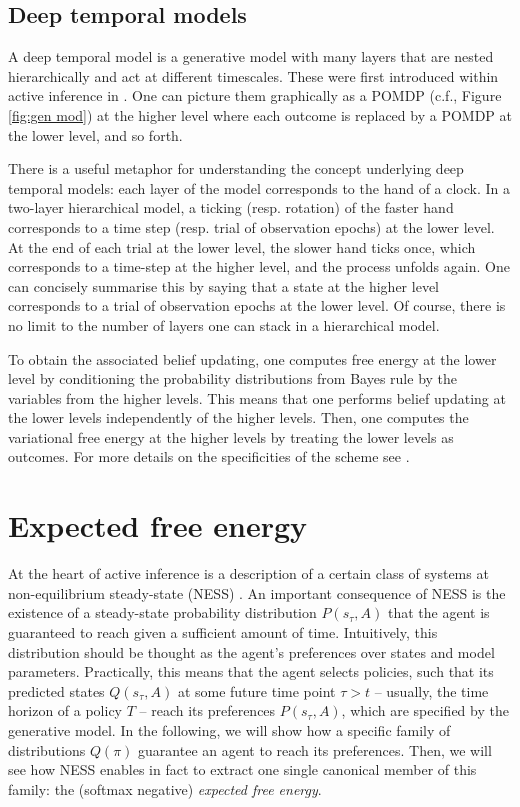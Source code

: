 \documentclass[review,12pt,authoryear]{elsarticle}
\begin{document}
\subsection{Deep temporal models}
\label{appendix: deep temporal models}

A deep temporal model is a generative model with many layers that are nested hierarchically and act at different timescales. These were first introduced within active inference in \citep{fristonActiveInferenceCuriosity2017}. One can picture them graphically as a POMDP (c.f., Figure \ref{fig:gen mod}) at the higher level where each outcome is replaced by a POMDP at the lower level, and so forth.

There is a useful metaphor for understanding the concept underlying deep temporal models: each layer of the model corresponds to the hand of a clock. In a two-layer hierarchical model, a ticking (resp. rotation) of the faster hand corresponds to a time step (resp. trial of observation epochs) at the lower level. At the end of each trial at the lower level, the slower hand ticks once, which corresponds to a time-step at the higher level, and the process unfolds again. One can concisely summarise this by saying that a state at the higher level corresponds to a trial of observation epochs at the lower level. Of course, there is no limit to the number of layers one can stack in a hierarchical model.

To obtain the associated belief updating, one computes free energy at the lower level by conditioning the probability distributions from Bayes rule by the variables from the higher levels. This means that one performs belief updating at the lower levels independently of the higher levels. Then, one computes the variational free energy at the higher levels by treating the lower levels as outcomes. For more details on the specificities of the scheme see \citep{fristonActiveInferenceCuriosity2017}.


\section{Expected free energy}
\label{Appendix:steady-state lemma}

At the heart of active inference is a description of a certain class of systems at non-equilibrium steady-state (NESS) \citep{parrMarkovBlanketsInformation2019,fristonFreeEnergyPrinciple2019}. An important consequence of NESS is the existence of a steady-state probability distribution $P(s_\tau,A)$ that the agent is guaranteed to reach given a sufficient amount of time. Intuitively, this distribution should be thought as the agent's preferences over states and model parameters. Practically, this means that the agent selects policies, such that its predicted states $Q(s_\tau,A)$ at some future time point $\tau >t$ -- usually, the time horizon of a policy $T$ -- reach its preferences $P(s_\tau,A)$, which are specified by the generative model. In the following, we will show how a specific family of distributions $Q(\pi)$ guarantee an agent to reach its preferences. Then, we will see how NESS enables in fact to extract one single canonical member of this family: the (softmax negative) \textit{expected free energy}.
\end{document}
